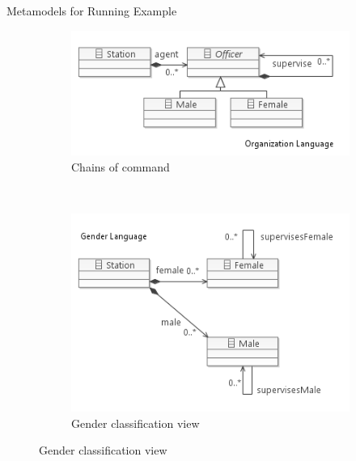 \documentclass[xcolor=dvipsnames, 14pt]{beamer}
\begin{document}
\begin{frame}{Metamodels for Running Example}
\begin{figure}[htb]
        \centering
        \begin{subfigure}[b]{0.50\textwidth}
                \centering
                \includegraphics[width=1\textwidth]{../figures/policestation_dsltrans/squadagent.png}
                \caption{Chains of command}
                \label{fig:OrganizationLanguage}
        \end{subfigure}%
        ~~
        \begin{subfigure}[b]{0.50\textwidth}
                \centering
                \includegraphics[width=1\textwidth]{../figures/policestation_dsltrans/squadsex.png}
                \caption{Gender classification view}
                \label{fig:GenderLanguage}
        \end{subfigure}%
        \label{fig:squadmetamodel}
\end{figure}
\end{frame}
\end{document}
